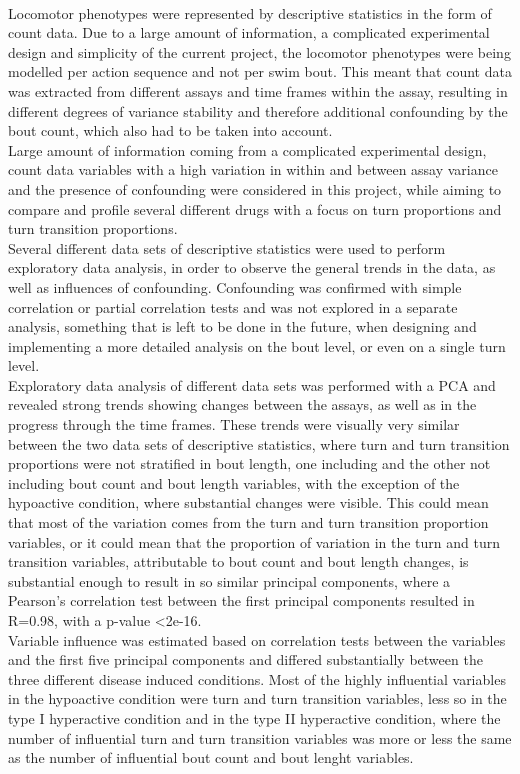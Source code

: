\documentclass[a4paper,12pt]{article}
\begin{document}
\\Locomotor phenotypes were represented by descriptive statistics in the form of count data. Due to a large amount of information, a complicated experimental design and simplicity of the current project, the locomotor phenotypes were being modelled per action sequence and not per swim bout. This meant that count data was extracted from different assays and time frames within the assay, resulting in different degrees of variance stability and therefore additional confounding by the bout count, which also had to be taken into account.\\Large amount of information coming from a complicated experimental design, count data variables with a high variation in within and between assay variance and the presence of confounding were considered in this project, while aiming to compare and profile several different drugs with a focus on turn proportions and turn transition proportions.
\\Several different data sets of descriptive statistics were used to perform exploratory data analysis, in order to observe the general trends in the data, as well as influences of confounding. Confounding was confirmed with simple correlation or partial correlation tests and was not explored in a separate analysis, something that is left to be done in the future, when designing and implementing a more detailed analysis on the bout level, or even on a single turn level.\\Exploratory data analysis of different data sets was performed with a PCA and revealed strong trends showing changes between the assays, as well as in the progress through the time frames. These trends were visually very similar between the two data sets of descriptive statistics, where turn and turn transition proportions were not stratified in bout length, one including and the other not including bout count and bout length variables, with the exception of the hypoactive condition, where substantial changes were visible. This could mean that most of the variation comes from the turn and turn transition proportion variables, or it could mean that the proportion of variation in the turn and turn transition variables, attributable to bout count and bout length changes, is substantial enough to result in so similar principal components, where a Pearson's correlation test between the first principal components resulted in R=0.98, with a p-value \textless2e-16.
\\Variable influence was estimated based on correlation tests between the variables and the first five principal components and differed substantially between the three different disease induced conditions. Most of the highly influential variables in the hypoactive condition were turn and turn transition variables, less so in the type I hyperactive condition and in the type II hyperactive condition, where the number of influential turn and turn transition variables was more or less the same as the number of influential bout count and bout lenght variables.
\end{document}
